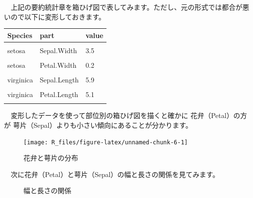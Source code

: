 \documentclass[
  12pt,
]{book}
\begin{document}
　上記の要約統計章を箱ひげ図で表してみます。ただし、元の形式では都合が悪いので以下に変形しておきます。

\begin{table}[H]
\centering
\begin{tabular}[t]{l|l|l}
\hline
Species & part & value\\
\hline
\cellcolor{gray!6}{setosa} & \cellcolor{gray!6}{Sepal.Length} & \cellcolor{gray!6}{5.1}\\
\hline
setosa & Sepal.Width & 3.5\\
\hline
\cellcolor{gray!6}{setosa} & \cellcolor{gray!6}{Petal.Length} & \cellcolor{gray!6}{1.4}\\
\hline
setosa & Petal.Width & 0.2\\
\hline
\cellcolor{gray!6}{NA} & \cellcolor{gray!6}{NA} & \cellcolor{gray!6}{...}\\
\hline
virginica & Sepal.Length & 5.9\\
\hline
\cellcolor{gray!6}{virginica} & \cellcolor{gray!6}{Sepal.Width} & \cellcolor{gray!6}{3}\\
\hline
virginica & Petal.Length & 5.1\\
\hline
\cellcolor{gray!6}{virginica} & \cellcolor{gray!6}{Petal.Width} & \cellcolor{gray!6}{1.8}\\
\hline
\end{tabular}
\end{table}

　変形したデータを使って部位別の箱ひげ図を描くと確かに 花弁（Petal）の方が 萼片（Sepal）よりも小さい傾向にあることが分かります。

\begin{figure}[H]

{\centering \texttt{[image: R\_files/figure-latex/unnamed-chunk-6-1]} 

}

\caption{花弁と萼片の分布}\label{fig:unnamed-chunk-6}
\end{figure}

　次に花弁（Petal）と萼片（Sepal）の幅と長さの関係を見てみます。

\begin{figure}[H]

{\centering {}

}

\caption{幅と長さの関係}\label{fig:unnamed-chunk-7}
\end{figure}
\end{document}
